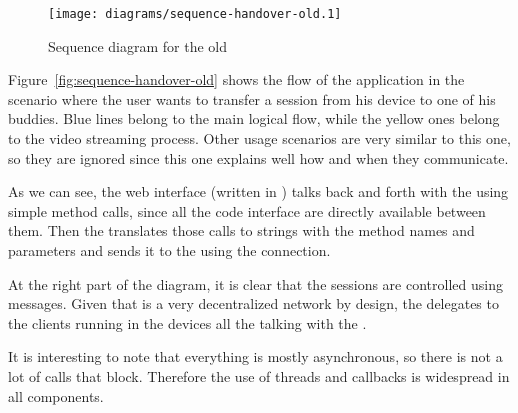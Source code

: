 \begin{figure}[htbp]
  \centering
    \texttt{[image: diagrams/sequence-handover-old.1]}
  \caption{Sequence diagram for the old }
  \label{fig:sequence-handover-old}
\end{figure}

Figure~\vref{fig:sequence-handover-old} shows the flow of the application in the scenario where the user wants to transfer a session from his device to one of his buddies.
Blue lines belong to the main logical flow, while the yellow ones belong to the video streaming process.
Other usage scenarios are very similar to this one, so they are ignored since this one explains well how and when they communicate.

As we can see, the web interface (written in ) talks back and forth with the  using simple method calls, since all the code interface are directly available between them.
Then the  translates those calls to strings with the method names and parameters and sends it to the  using the  connection.

At the right part of the diagram, it is clear that the sessions are controlled using  messages.
Given that  is a very decentralized network by design, the  delegates to the  clients running in the devices all the talking with the .

It is interesting to note that everything is mostly asynchronous, so there is not a lot of calls that block.
Therefore the use of threads and callbacks is widespread in all components.

